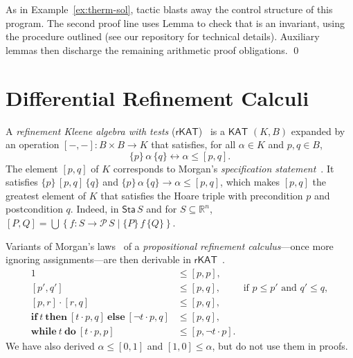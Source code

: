 \documentclass[envcountsame,envcountsect]{llncs}
\newcommand{\IF}[3]{\mathbf{if}\ #1\ \mathbf{then}\ #2\ \mathbf{else}\ #3}
\newcommand{\WHILE}[2]{\mathbf{while}\ #1\ \mathbf{do}\ #2}
\newcommand{\KAT}{\mathsf{KAT}}
\newcommand{\rKAT}{\mathsf{rKAT}}
\newcommand{\Pow}{\mathcal{P}}
\newcommand{\reals}{\mathbb{R}}
\newcommand{\sta}{\mathsf{Sta}}
\begin{document}
\begin{example}
\noindent As in Example~\ref{ex:therm-sol}, tactic 
blasts away the control structure of this program. The second proof
line uses Lemma  to check that  is an
invariant, using the procedure outlined (see our repository for
technical details). Auxiliary lemmas then discharge the remaining
arithmetic proof obligations.  \qed
\end{example}


\section{Differential Refinement Calculi}\label{sec:refine}

A \emph{refinement Kleene algebra with tests}
($\rKAT$)~\cite{ArmstrongGS16}  is a $\KAT$
$(K,B)$ expanded by an operation $[-,-]:B\times B\to K$ that
satisfies, for all $\alpha \in K$ and $p,q\in B$, 
\begin{equation*}
  \{p\}\, \alpha\, \{q\} \leftrightarrow \alpha\le [p,q].
\end{equation*}
The element $[p,q]$ of $K$ corresponds to Morgan's \emph{specification
  statement}~\cite{Morgan94}. It satisfies $\{p\}\, [p,q]\, \{q\}$
and $\{p\}\, \alpha\, \{q\} \rightarrow \alpha\le [p,q]$, 
which makes $[p,q]$ the greatest element of $K$ that satisfies the Hoare
triple with precondition $p$ and postcondition $q$.  Indeed, in
$\sta\, S$ and for $S\subseteq \reals^n$,
$ [P,Q] = \bigcup \left\{f:S\to \Pow\, S \mid \{P\}\, f\,
  \{Q\}\right\}$. 

Variants of Morgan's laws~\cite{Morgan94} of a \emph{propositional
  refinement calculus}---once more ignoring assignments---are then derivable in
$\rKAT$~\cite{ArmstrongGS16}.
\begin{align}
  1 &\le [p,p],\label{eq:r-skip}\tag{r-skip}\\
[p',q'] &\le [p,q],\qquad \text{ if } p\le p'\text{ and } q'\le q,\label{eq:r-cons}\tag{r-cons}\\
[p,r]\cdot [r,q] &\le [p,q],\label{eq:r-seq}\tag{r-seq}\\
\IF{t}{[t\cdot p,q]}{[\neg t\cdot p,q]} &\le [p,q],\label{eq:r-cond}\tag{r-cond}\\
 \WHILE{t}{[t\cdot p,p]} &\le [p,\neg t\cdot p]. \label{eq:r-while}\tag{r-while}
\end{align}
We have also derived $\alpha \le [0,1]$ and $[1,0] \le \alpha$, but do
not use them in proofs.
\end{document}
